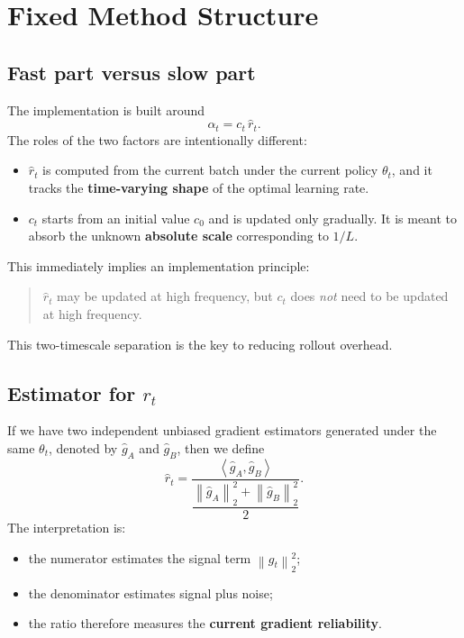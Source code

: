 \documentclass[11pt,a4paper]{article}
\newcommand{\norm}[1]{\left\lVert #1 \right\rVert_2}
\newcommand{\ip}[2]{\left\langle #1,#2 \right\rangle}
\newcommand{\ghat}{\hat g}
\newcommand{\rhat}{\hat r_t}
\begin{document}
\section{Fixed Method Structure}
\subsection{Fast part versus slow part}
The implementation is built around
\begin{equation}
\alpha_t = c_t\,\rhat.
\end{equation}
The roles of the two factors are intentionally different:
\begin{itemize}[leftmargin=2em]
    \item $\rhat$ is computed from the current batch under the current policy $\theta_t$, and it tracks the \textbf{time-varying shape} of the optimal learning rate.
    \item $c_t$ starts from an initial value $c_0$ and is updated only gradually. It is meant to absorb the unknown \textbf{absolute scale} corresponding to $1/L$.
\end{itemize}
This immediately implies an implementation principle:
\begin{quote}
$\rhat$ may be updated at high frequency, but $c_t$ does \emph{not} need to be updated at high frequency.
\end{quote}
This two-timescale separation is the key to reducing rollout overhead.

\subsection{Estimator for $\rhat$}
If we have two independent unbiased gradient estimators generated under the same $\theta_t$, denoted by $\ghat_A$ and $\ghat_B$, then we define
\begin{equation}
\rhat = \frac{\ip{\ghat_A}{\ghat_B}}{\dfrac{\norm{\ghat_A}^2 + \norm{\ghat_B}^2}{2}}.
\end{equation}
The interpretation is:
\begin{itemize}[leftmargin=2em]
    \item the numerator estimates the signal term $\norm{g_t}^2$;
    \item the denominator estimates signal plus noise;
    \item the ratio therefore measures the \textbf{current gradient reliability}.
\end{itemize}
\end{document}
